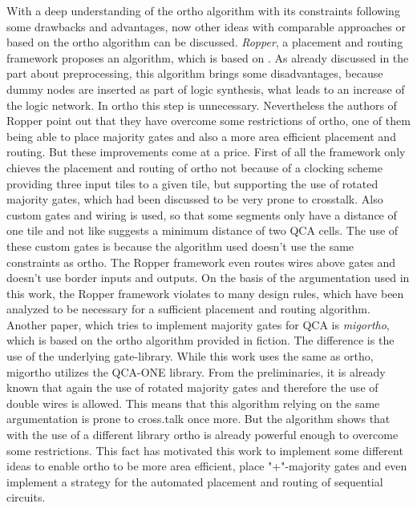 With a deep understanding of the ortho algorithm with its constraints following some drawbacks and advantages, now other ideas with comparable approaches or based on the ortho algorithm can be discussed. \textit{Ropper}, a placement and routing framework \cite{ropper} proposes an algorithm, which is based on \cite{trindade2016placement}. As already discussed in the part about preprocessing, this algorithm brings some disadvantages, because dummy nodes are inserted as part of logic synthesis, what leads to an increase of the logic network. In ortho this step is unnecessary. Nevertheless the authors of Ropper point out that they have overcome some restrictions of ortho, one of them being able to place majority gates and also a more area efficient placement and routing. But these improvements come at a price. First of all the framework only chieves the placement and routing of ortho not because of a clocking scheme providing three input tiles to a given tile, but supporting the use of rotated majority gates, which had been discussed to be very prone to crosstalk. Also custom gates and wiring is used, so that some segments only have a distance of one tile and not like \cite{crosstalk} suggests a minimum distance of two QCA cells. The use of these custom gates is because the algorithm used doesn't use the same constraints as ortho. The Ropper framework even routes wires above gates and doesn't use border inputs and outputs. On the basis of the argumentation used in this work, the Ropper framework violates to many design rules, which have been analyzed to be necessary for a sufficient placement and routing algorithm.\\
Another paper, which tries to implement majority gates for QCA is \textit{migortho}, which is based on the ortho algorithm provided in fiction. The difference is the use of the underlying gate-library. While this work uses the same as ortho, migortho utilizes the QCA-ONE library. From the preliminaries, it is already known that again the use of rotated majority gates and therefore the use of double wires is allowed. This means that this algorithm relying on the same argumentation is prone to cross.talk once more. But the algorithm shows that with the use of a different library ortho is already powerful enough to overcome some restrictions. This fact has motivated this work to implement some different ideas to enable ortho to be more area efficient, place "+"-majority gates and even implement a strategy for the automated placement and routing of sequential circuits.

